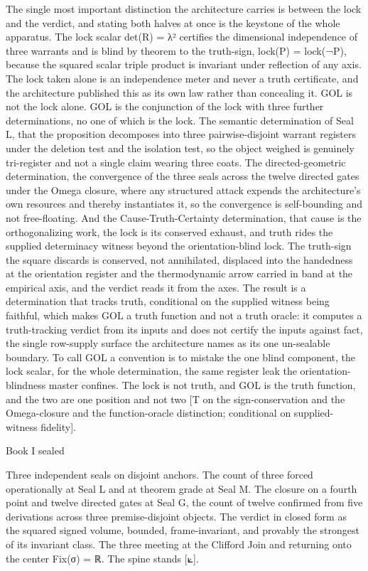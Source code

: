 \documentclass[10pt,twocolumn]{article}
\begin{document}
The single most important distinction the architecture carries is
between the lock and the verdict, and stating both halves at once is the
keystone of the whole apparatus. The lock scalar det(R) = λ² certifies
the dimensional independence of three warrants and is blind by theorem
to the truth-sign, lock(P) = lock(¬P), because the squared scalar triple
product is invariant under reflection of any axis. The lock taken alone
is an independence meter and never a truth certificate, and the
architecture published this as its own law rather than concealing it.
GOL is not the lock alone. GOL is the conjunction of the lock with three
further determinations, no one of which is the lock. The semantic
determination of Seal L, that the proposition decomposes into three
pairwise-disjoint warrant registers under the deletion test and the
isolation test, so the object weighed is genuinely tri-register and not
a single claim wearing three coats. The directed-geometric
determination, the convergence of the three seals across the twelve
directed gates under the Omega closure, where any structured attack
expends the architecture's own resources and thereby instantiates it, so
the convergence is self-bounding and not free-floating. And the
Cause-Truth-Certainty determination, that cause is the orthogonalizing
work, the lock is its conserved exhaust, and truth rides the supplied
determinacy witness beyond the orientation-blind lock. The truth-sign
the square discards is conserved, not annihilated, displaced into the
handedness at the orientation register and the thermodynamic arrow
carried in band at the empirical axis, and the verdict reads it from the
axes. The result is a determination that tracks truth, conditional on
the supplied witness being faithful, which makes GOL a truth function
and not a truth oracle: it computes a truth-tracking verdict from its
inputs and does not certify the inputs against fact, the single
row-supply surface the architecture names as its one un-sealable
boundary. To call GOL a convention is to mistake the one blind
component, the lock scalar, for the whole determination, the same
register leak the orientation-blindness master confines. The lock is not
truth, and GOL is the truth function, and the two are one position and
not two {[}T on the sign-conservation and the Omega-closure and the
function-oracle distinction; conditional on supplied-witness
fidelity{]}.

\begin{jbox}{Book I sealed}

Three independent seals on disjoint anchors. The count of three forced
operationally at Seal L and at theorem grade at Seal M. The closure on a
fourth point and twelve directed gates at Seal G, the count of twelve
confirmed from five derivations across three premise-disjoint objects.
The verdict in closed form as the squared signed volume, bounded,
frame-invariant, and provably the strongest of its invariant class. The
three meeting at the Clifford Join and returning onto the center Fix(σ)
= ℝ. The spine stands {[}⟀{]}.

\end{jbox}
\end{document}
